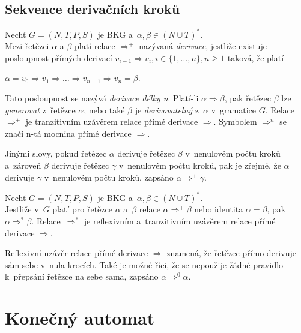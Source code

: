 \subsection*{Sekvence derivačních kroků}\label{kap_sekvence_der_kroku}
\begin{definition}\label{ref_tranz_uzaver}
    Nechť $G = (N, T, P, S)$ je BKG a~$\alpha, \beta \in (N \cup T)^*$. \\
    Mezi řetězci $\alpha$ a $\beta$ platí relace $\Rightarrow^+$ nazývaná \emph{derivace}, jestliže existuje posloupnost přímých derivací $v_{i-1} \Rightarrow v_i, i \in \{1, \ldots, n\}, n \geq 1$ taková, že platí
    \begin{center}
        $\alpha = v_0 \Rightarrow v_1 \Rightarrow \ldots \Rightarrow v_{n-1} \Rightarrow v_n = \beta$.
    \end{center}
    Tato posloupnost se nazývá \emph{derivace délky n}.
    Platí-li $\alpha \Rightarrow \beta$, pak řetězec $\beta$ lze \emph{generovat} z~řetězce $\alpha$, nebo také $\beta$ je \emph{derivovatelný} z~$\alpha$ v~gramatice $G$.
    Relace $\Rightarrow^+$ je tranzitivním uzávěrem relace přímé derivace $\Rightarrow$.
    Symbolem $\Rightarrow^n$ se značí n-tá mocnina přímé derivace $\Rightarrow$.
\end{definition}
Jinými slovy, pokud řetězec $\alpha$ derivuje řetězec $\beta$ v~nenulovém počtu kroků a~zároveň $\beta$ derivuje řetězec $\gamma$ v~nenulovém počtu kroků, pak je zřejmé, že $\alpha$ derivuje $\gamma$ v~nenulovém počtu kroků, zapsáno $\alpha \Rightarrow^+ \gamma$. 

\begin{definition}\label{def_refl_uzaver}
    Nechť $G = (N, T, P, S)$ je BKG a~$\alpha, \beta \in (N \cup T)^*$. \\
    Jestliže v~$G$ platí pro řetězce $\alpha$ a~$\beta$ relace $\alpha \Rightarrow^+ \beta$ nebo identita $\alpha = \beta$, pak $\alpha \Rightarrow^* \beta$.
    Relace~$\Rightarrow^*$ je reflexivním a~tranzitivním uzávěrem relace přímé derivace $\Rightarrow$.  
\end{definition}
Reflexivní uzávěr relace přímé derivace $\Rightarrow$ znamená, že řetězec přímo derivuje sám sebe v~nula krocích.
Také je možné říci, že se nepoužije žádné pravidlo k~přepsání řetězce na sebe sama, zapsáno $\alpha \Rightarrow^0 \alpha$.


\section{Konečný automat}
\begin{definition}\label{def_konecny_automat}
    
\end{definition}

